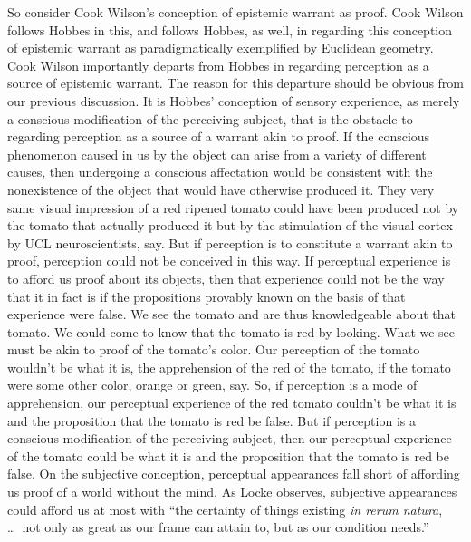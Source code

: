 \documentclass[12pt]{article}
\begin{document}
So consider Cook Wilson's conception of epistemic warrant as proof. Cook Wilson follows Hobbes in this, and follows Hobbes, as well, in regarding this conception of epistemic warrant as paradigmatically exemplified by Euclidean geometry. Cook Wilson importantly departs from Hobbes in regarding perception as a source of epistemic warrant. The reason for this departure should be obvious from our previous discussion. It is Hobbes' conception of sensory experience, as merely a conscious modification of the perceiving subject, that is the obstacle to regarding perception as a source of a warrant akin to proof. If the conscious phenomenon caused in us by the object can arise from a variety of different causes, then undergoing a conscious affectation would be consistent with the nonexistence of the object that would have otherwise produced it. They very same visual impression of a red ripened tomato could have been produced not by the tomato that actually produced it but by the stimulation of the visual cortex by UCL neuroscientists, say. But if perception is to constitute a warrant akin to proof, perception could not be conceived in this way. If perceptual experience is to afford us proof about its objects, then that experience could not be the way that it in fact is if the propositions provably known on the basis of that experience were false. We see the tomato and are thus knowledgeable about that tomato. We could come to know that the tomato is red by looking. What we see must be akin to proof of the tomato's color. Our perception of the tomato wouldn't be what it is, the apprehension of the red of the tomato, if the tomato were some other color, orange or green, say. So, if perception is a mode of apprehension, our perceptual experience of the red tomato couldn't be what it is and the proposition that the tomato is red be false. But if perception is a conscious modification of the perceiving subject, then our perceptual experience of the tomato could be what it is and the proposition that the tomato is red be false. On the subjective conception, perceptual appearances fall short of affording us proof of a world without the mind. As Locke observes, subjective appearances could afford us at most with ``the certainty of things existing \emph{in rerum natura}, \dots\ not only as great as our frame can attain to, but as our condition needs.''
\end{document}

